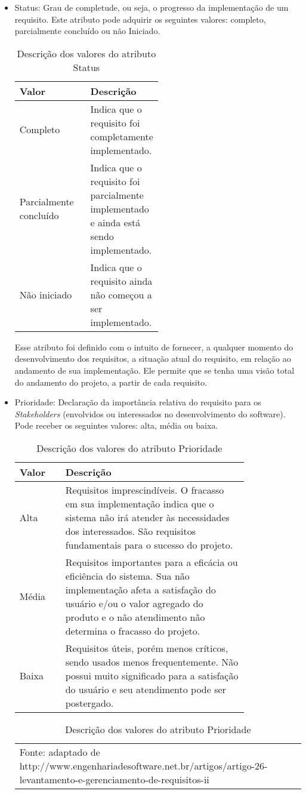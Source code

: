 \begin{itemize}
\item Status:
Grau de completude, ou seja, o progresso da implementação de um requisito. Este atributo pode adquirir os seguintes valores: completo, parcialmente concluído ou não Iniciado.

\begin{table}[h]
\centering
\caption{Descrição dos valores do atributo Status}
\label{Rotulo}
\begin{tabular}{ | l | p{0.5\linewidth} | }
\hline
\textbf{Valor} & \textbf{Descrição} \\ \hline
Completo &  Indica que o requisito foi completamente implementado. \\ \hline
Parcialmente concluído & Indica que o requisito foi parcialmente implementado e ainda está sendo implementado. \\ \hline
Não iniciado & Indica que o requisito ainda não começou a ser implementado. \\ \hline
\end{tabular}
\end{table}

Esse atributo foi definido com o intuito de fornecer, a qualquer momento do desenvolvimento dos requisitos, a situação atual do requisito, em relação ao andamento de sua implementação. Ele permite que se tenha uma visão total do andamento do projeto, a partir de cada requisito.

\item Prioridade:
Declaração da importância relativa do requisito para os \textit{Stakeholders} (envolvidos ou interessados no desenvolvimento do software). Pode receber os seguintes valores: alta, média ou baixa.

\begin{table}[h]
\centering
\caption{Descrição dos valores do atributo Prioridade}
\label{Rotulo}
\begin{tabular}{ | l | p{0.8\linewidth} | }
\hline
\textbf{Valor} & \textbf{Descrição} \\ \hline
Alta &  Requisitos imprescindíveis. O fracasso em sua implementação indica que o sistema não irá atender às necessidades dos interessados. São requisitos fundamentais para o sucesso do projeto. \\ \hline
Média & Requisitos importantes para a eficácia ou eficiência do sistema. Sua não implementação afeta a satisfação do usuário e/ou o valor agregado do produto e o não atendimento não determina o fracasso do projeto. \\ \hline
Baixa & Requisitos úteis, porém menos críticos, sendo usados menos frequentemente. Não possui muito significado para a satisfação do usuário e seu atendimento pode ser postergado. \\ \hline
\end{tabular}
\begin{tabular} { l }
\tiny Fonte: adaptado de  http://www.engenhariadesoftware.net.br/artigos/artigo-26-levantamento-e-gerenciamento-de-requisitos-ii 
\end{tabular}
\end{table}


\end{itemize}
